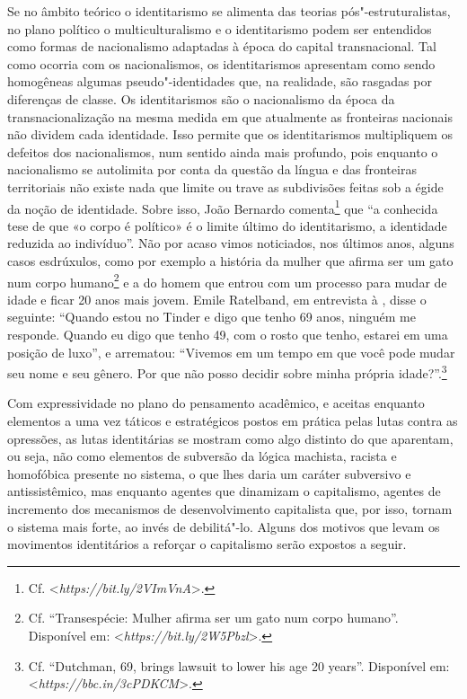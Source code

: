 Se no âmbito teórico o identitarismo se alimenta das teorias
pós"-estruturalistas, no plano político o multiculturalismo e o
identitarismo podem ser entendidos como formas de nacionalismo adaptadas
à época do capital transnacional. Tal como ocorria com os nacionalismos,
os identitarismos apresentam como sendo homogêneas algumas
pseudo"-identidades que, na realidade, são rasgadas por diferenças de
classe. Os identitarismos são o nacionalismo da época da
transnacionalização na mesma medida em que atualmente as fronteiras
nacionais não dividem cada identidade. Isso permite que os
identitarismos multipliquem os defeitos dos nacionalismos, num sentido
ainda mais profundo, pois enquanto o nacionalismo se autolimita por
conta da questão da língua e das fronteiras territoriais não existe nada
que limite ou trave as subdivisões feitas sob a égide da noção de
identidade. Sobre isso, João Bernardo comenta\footnote{Cf.
  \textless{}\emph{https://bit.ly/2VImVnA}\textgreater{}.} que
``a conhecida tese de que «o corpo é político» é o limite último do
identitarismo, a identidade reduzida ao indivíduo''. Não por acaso vimos
noticiados, nos últimos anos, alguns casos esdrúxulos, como por exemplo
a história da mulher que afirma ser um gato num corpo humano\footnote{Cf.
  ``Transespécie: Mulher afirma ser um gato num corpo humano''.
  Disponível em: \textless{}\emph{https://bit.ly/2W5Pbzl}\textgreater{}.} e a do homem que
entrou com um processo para mudar de idade e ficar 20 anos mais jovem.
Emile Ratelband, em entrevista à , disse o seguinte: ``Quando estou
no Tinder e digo que tenho 69 anos, ninguém me responde. Quando eu digo
que tenho 49, com o rosto que tenho, estarei em uma posição de luxo'', e
arrematou: ``Vivemos em um tempo em que você pode mudar seu nome e seu
gênero. Por que não posso decidir sobre minha própria
idade?''.\footnote{Cf. ``Dutchman, 69, brings lawsuit to lower his age
  20 years''. Disponível em: \textless{}\emph{https://bbc.in/3cPDKCM}\textgreater{}.}

Com expressividade no plano do pensamento acadêmico, e aceitas enquanto
elementos a uma vez táticos e estratégicos postos em prática pelas lutas
contra as opressões, as lutas identitárias se mostram como algo distinto
do que aparentam, ou seja, não como elementos de subversão da lógica
machista, racista e homofóbica presente no sistema, o que lhes daria um
caráter subversivo e antissistêmico, mas enquanto agentes que dinamizam
o capitalismo, agentes de incremento dos mecanismos de desenvolvimento
capitalista que, por isso, tornam o sistema mais forte, ao invés de
debilitá"-lo. Alguns dos motivos que levam os movimentos identitários a
reforçar o capitalismo serão expostos a seguir.

